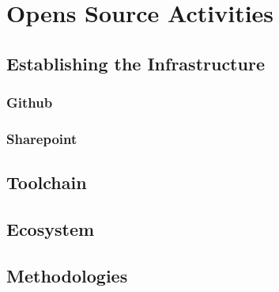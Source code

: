 ﻿\section{Opens Source Activities}

\subsection{Establishing the Infrastructure}

\subsubsection{Github}

\subsubsection{Sharepoint}

\subsection{Toolchain}

\subsection{Ecosystem}

\subsection{Methodologies}
